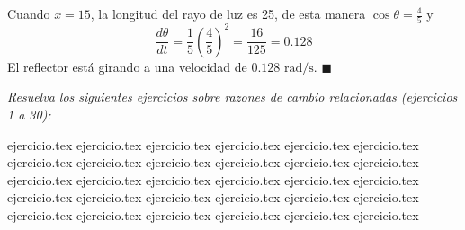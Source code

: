 
\noindent Cuando $x = 15$, la longitud del rayo de luz es 25, de esta manera $\cos \theta = \frac{4}{5}$ y
$$\frac{d\theta}{dt} = \frac{1}{5} \left( \frac{4}{5} \right)^2 = \frac{16}{125} = 0.128$$
El reflector está girando a una velocidad de $0.128 \text{ rad/s}$. \hfill $\blacksquare$

\noindent \textit{Resuelva los siguientes ejercicios sobre razones de cambio relacionadas (ejercicios 1 a 30):}

\begin{enumerate}
    {ejercicio.tex}
    {ejercicio.tex}
    {ejercicio.tex}
    {ejercicio.tex}
    {ejercicio.tex}
    {ejercicio.tex}
    {ejercicio.tex}
    {ejercicio.tex}
    {ejercicio.tex}
    {ejercicio.tex}
    {ejercicio.tex}
    {ejercicio.tex}
    {ejercicio.tex}
    {ejercicio.tex}
    {ejercicio.tex}
    {ejercicio.tex}
    {ejercicio.tex}
    {ejercicio.tex}
    {ejercicio.tex}
    {ejercicio.tex}
    {ejercicio.tex}
    {ejercicio.tex}
    {ejercicio.tex}
    {ejercicio.tex}
    {ejercicio.tex}
    {ejercicio.tex}
    {ejercicio.tex}
    {ejercicio.tex}
    {ejercicio.tex}
    {ejercicio.tex}
\end{enumerate}
